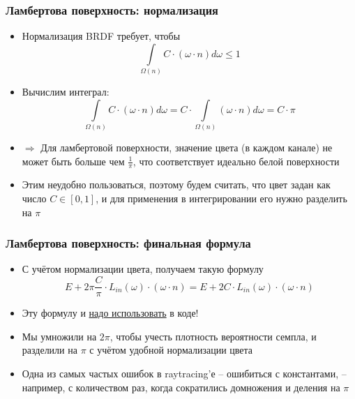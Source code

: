 \documentclass[10pt]{beamer}
\begin{document}
\begin{frame}[fragile]
\frametitle{Ламбертова поверхность: нормализация}
\begin{itemize}
\item Нормализация BRDF требует, чтобы \begin{equation*}\int\limits_{\Omega(n)} C\cdot (\omega\cdot n) d\omega \leq 1\end{equation*}
\pause
\item Вычислим интеграл:
\begin{equation*}\int\limits_{\Omega(n)} C\cdot (\omega\cdot n) d\omega = C\cdot\int\limits_{\Omega(n)} (\omega\cdot n) d\omega = C\cdot \pi\end{equation*}
\pause
\item \begin{math}\Longrightarrow\end{math} Для ламбертовой поверхности, значение цвета (в каждом канале) не может быть больше чем \begin{math}\frac{1}{\pi}\end{math}, что соответствует идеально белой поверхности
\pause
\item Этим неудобно пользоваться, поэтому будем считать, что цвет задан как число \begin{math}C \in [0, 1]\end{math}, и для применения в интегрировании его нужно разделить на \begin{math}\pi\end{math}
\end{itemize}
\end{frame}

\begin{frame}[fragile]
\frametitle{Ламбертова поверхность: финальная формула}
\begin{itemize}
\item С учётом нормализации цвета, получаем такую формулу
\begin{equation*}
E + 2\pi \frac{C}{\pi} \cdot L_{in}(\omega) \cdot (\omega \cdot n) = E + 2 C \cdot L_{in}(\omega) \cdot (\omega \cdot n)
\end{equation*}
\pause
\item Эту формулу и \underline{надо использовать} в коде!
\pause
\item Мы умножили на \begin{math}2\pi\end{math}, чтобы учесть плотность вероятности семпла, и разделили на \begin{math}\pi\end{math} с учётом удобной нормализации цвета
\pause
\item Одна из самых частых ошибок в raytracing'е -- ошибиться с константами, -- например, с количеством раз, когда сократились домножения и деления на \begin{math}\pi\end{math}
\end{itemize}
\end{frame}
\end{document}
